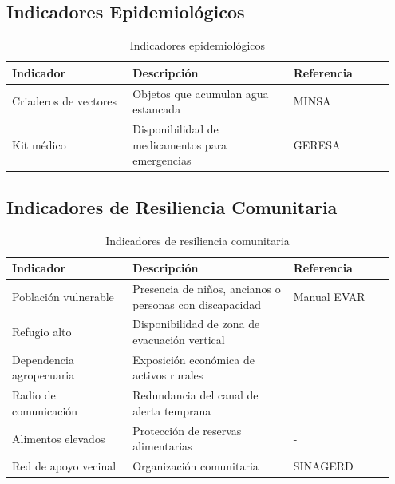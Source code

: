 \documentclass[12pt, letterpaper]{article}
\begin{document}
\subsection{Indicadores Epidemiológicos}

\begin{table}[H]
\centering
\caption{Indicadores epidemiológicos}
\label{tab:ind_epidemiologicos}
\begin{tabular}{@{}p{0.3\linewidth}p{0.4\linewidth}p{0.25\linewidth}@{}}
\toprule
\textbf{Indicador} & \textbf{Descripción} & \textbf{Referencia} \\ \midrule
Criaderos de vectores & Objetos que acumulan agua estancada & MINSA \parencite{minsa_alerta_2023} \\
Kit médico & Disponibilidad de medicamentos para emergencias & GERESA \parencite{geresa_sala} \\ \bottomrule
\end{tabular}
\end{table}

\subsection{Indicadores de Resiliencia Comunitaria}

\begin{table}[H]
\centering
\caption{Indicadores de resiliencia comunitaria}
\label{tab:ind_resiliencia}
\begin{tabular}{@{}p{0.3\linewidth}p{0.4\linewidth}p{0.25\linewidth}@{}}
\toprule
\textbf{Indicador} & \textbf{Descripción} & \textbf{Referencia} \\ \midrule
Población vulnerable & Presencia de niños, ancianos o personas con discapacidad & Manual EVAR \parencite{cenepred_manual_evar} \\
Refugio alto & Disponibilidad de zona de evacuación vertical & \parencite{cenepred_manual_evar} \\
Dependencia agropecuaria & Exposición económica de activos rurales & \parencite{cenepred_manual_evar} \\
Radio de comunicación & Redundancia del canal de alerta temprana & \parencite{cenepred_manual_evar} \\
Alimentos elevados & Protección de reservas alimentarias & - \\
Red de apoyo vecinal & Organización comunitaria & SINAGERD \parencite{cenepred_manual_evar} \\ \bottomrule
\end{tabular}
\end{table}
\end{document}
